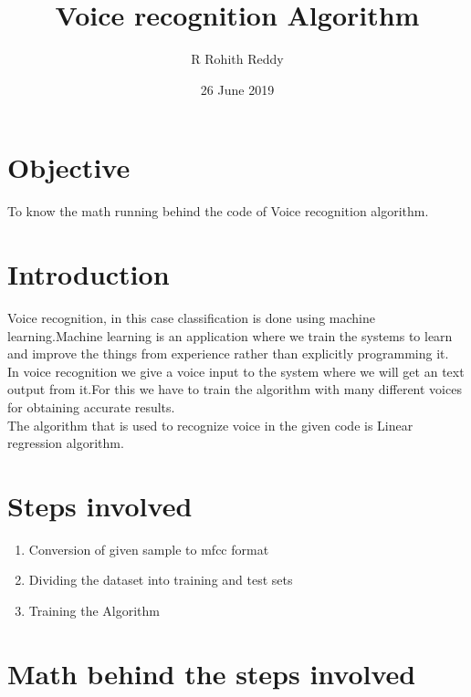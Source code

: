 \documentclass[12pt,letterpaper]{article}
\title{Voice recognition Algorithm}
\author{R Rohith Reddy}
\date{26 June 2019}
\newcommand{\<}{\langle}
\renewcommand{\>}{\rangle}
\theoremstyle{definition}
\begin{document}
\maketitle

\section{Objective}
To know the math running behind the code of Voice recognition algorithm.

\section{Introduction}
Voice recognition, in this case classification is done using machine learning.Machine learning is an application where we train the systems to learn and improve the things from experience rather than explicitly programming it.\\
In voice recognition we give a voice input to the system where we will get an text output from it.For this we have to train the algorithm with many different voices for obtaining accurate results. \\
The algorithm that is used to recognize voice in the given code is Linear regression algorithm.

\section{Steps involved}
\begin{enumerate}
	\item Conversion of given sample to mfcc format
	\item Dividing the dataset into training and test sets
	\item Training the Algorithm
\end{enumerate}

\section{Math behind the steps involved}
\end{document}
